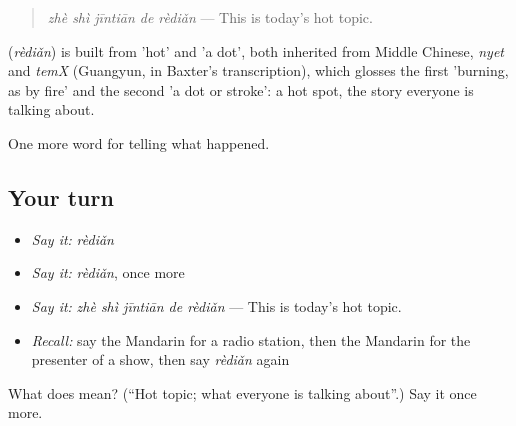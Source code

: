 \begin{quote}
\textbf{} \emph{zhè shì jīntiān de rèdiǎn} — This is today's hot topic.
\end{quote}

\begin{cousinweb}
\textbf{} (\emph{rèdiǎn}) is built from  'hot' and  'a dot', both inherited from Middle Chinese, \emph{nyet} and \emph{temX} (Guangyun, in Baxter's transcription), which glosses the first 'burning, as by fire' and the second 'a dot or stroke': a hot spot, the story everyone is talking about.
\end{cousinweb}

\begin{grammarlens}[title={What you've built}]
One more word for telling what happened.
\end{grammarlens}

\subsection*{Your turn}
\begin{itemize}
\raggedright
  \item \emph{Say it:} \emph{rèdiǎn}
  \item \emph{Say it:} \emph{rèdiǎn}, once more
  \item \emph{Say it:} \emph{zhè shì jīntiān de rèdiǎn} — This is today's hot topic.
  \item \emph{Recall:} say the Mandarin for a radio station, then the Mandarin for the presenter of a show, then say \emph{rèdiǎn} again
\end{itemize}

\begin{tcolorbox}[breakable,colback=teal!4,colframe=teal!35!black,title={Before you move on}]
What does  mean? (\textquotedblleft{}Hot topic; what everyone is talking about\textquotedblright{}.) Say it once more.
\end{tcolorbox}
